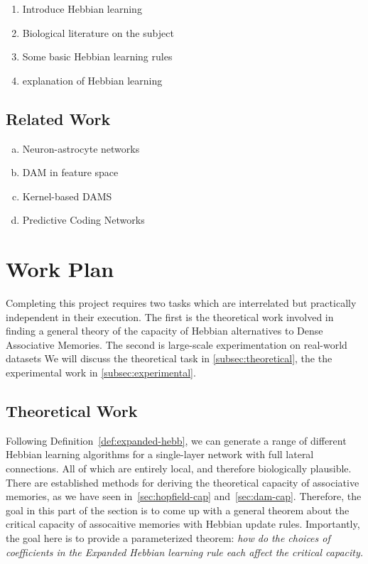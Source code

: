 \documentclass{article}
\theoremstyle{definition}
\begin{document}
\begin{enumerate}
  \item Introduce Hebbian learning
  \item Biological literature on the subject
  \item Some basic Hebbian learning rules
  \item \textcite{gerstner_mathematical_2002} explanation of Hebbian learning
\end{enumerate}

\subsection{Related Work}\label{sec:related-work}

\begin{enumerate}[(a)]
  \item Neuron-astrocyte networks
  \item DAM in feature space
  \item Kernel-based DAMS
  \item Predictive Coding Networks
\end{enumerate}

\section{Work Plan}

Completing this project requires two tasks which are interrelated but
practically independent in their execution. The first is the theoretical
work involved in finding a general theory of the capacity of Hebbian
alternatives
to Dense Associative Memories. The second is large-scale experimentation
on real-world datasets We will discuss the theoretical task in
\autoref{subsec:theoretical},
the the experimental work in \autoref{subsec:experimental}.

\subsection{Theoretical Work}\label{subsec:theoretical}

Following Definition~\ref{def:expanded-hebb}, we can generate a range of
different Hebbian learning algorithms for a single-layer
network with full lateral connections. All of which are entirely local,
and therefore biologically plausible. There are established methods for
deriving the theoretical capacity of associative memories, as we have
seen in~\autoref{sec:hopfield-cap} and~\autoref{sec:dam-cap}. Therefore,
the goal in this part of the section is to come up with a general theorem
about the critical capacity of assocaitive memories with Hebbian update
rules.
Importantly, the goal here is to provide a parameterized theorem: \textit{how
  do the choices of coefficients in the Expanded Hebbian learning rule
each affect the critical capacity.}
\end{document}
